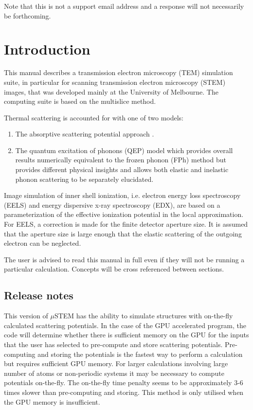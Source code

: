 \documentclass[12pt,a4paper]{article}
\begin{document}
\noindent Note that this is not a support email address and a response will not necessarily be forthcoming.\\


\newpage
 

\section{Introduction}

This manual describes a transmission electron microscopy (TEM) simulation suite, in particular for scanning  transmission electron microscopy (STEM) images, that was developed mainly at the University of Melbourne. The computing suite is based on the multislice method.


Thermal scattering is accounted for with one of two models:
%
\begin{enumerate}
\item{The absorptive scattering potential approach \cite{AFOR1,BK1,HH1}}.
\item{The quantum excitation of phonons (QEP) model \cite{Forbes2010} which provides overall results numerically equivalent to the frozen phonon (FPh) method \cite{LXS2} but provides different  physical insights and allows both elastic and inelastic phonon scattering to be separately elucidated}. 
\end{enumerate}
%
Image simulation of inner shell ionization, i.e. electron energy loss spectroscopy (EELS) and energy dispersive x-ray spectroscopy (EDX), are based on a parameterization of the effective ionization potential in the local approximation. For EELS, a correction is made for the finite detector aperture size. It is assumed that the aperture size is large enough that the elastic scattering of the outgoing electron can be neglected. 

The user is advised to read this manual in full even if they will not be running a particular calculation. Concepts will be cross referenced between sections.

\subsection{Release notes}

This version of $\mu$STEM has the ability to simulate structures with on-the-fly calculated scattering potentials.
In the case of the GPU accelerated program, the code will determine whether there is sufficient memory on the GPU for the inputs that the user has selected to pre-compute and store scattering potentials.
Pre-computing and storing the potentials is the fastest way to perform a calculation but requires sufficient GPU memory.
For larger calculations involving large number of atoms or non-periodic systems it may be necessary to compute potentials on-the-fly. The on-the-fly time penalty seems to be approximately 3-6 times slower than pre-computing and storing. 
This method is only utilised when the GPU memory is insufficient.
\end{document}
